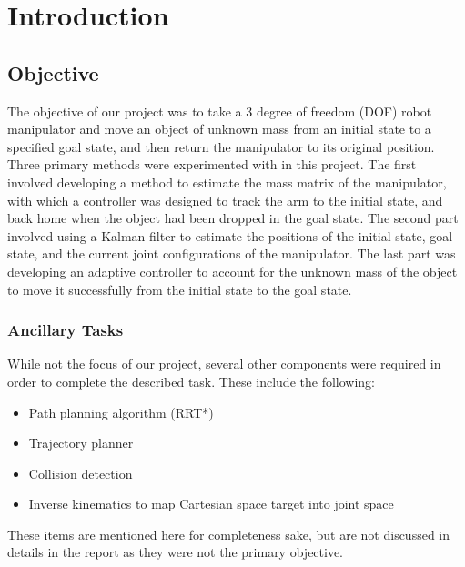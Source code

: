 \section{Introduction}
\subsection*{Objective}
The objective of our project was to take a 3 degree of freedom (DOF) robot manipulator and move an object of unknown mass from an initial state to a specified goal state, and then return the manipulator to its original position.
Three primary methods were experimented with in this project.
The first involved developing a method to estimate the mass matrix of the manipulator, with which a controller was designed to track the arm to the initial state, and back home when the object had been dropped in the goal state.
The second part involved using a Kalman filter to estimate the positions of the initial state, goal state, and the current joint configurations of the manipulator.
The last part was developing an adaptive controller to account for the unknown mass of the object to move it successfully from the initial state to the goal state.

\subsubsection*{Ancillary Tasks}
While not the focus of our project, several other components were required in order to complete the described task.
These include the following:

\begin{itemize}
  \item Path planning algorithm (RRT*)
  \item Trajectory planner
  \item Collision detection
  \item Inverse kinematics to map Cartesian space target into joint space
\end{itemize}

\noindent These items are mentioned here for completeness sake, but are not discussed in details in the report as they were not the primary objective.




